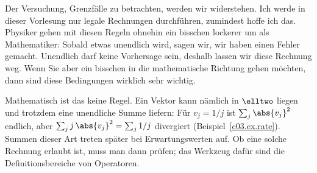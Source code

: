 \begin{fundament}
  Der Versuchung, Grenzfälle zu betrachten, werden wir widerstehen. Ich werde in dieser
  Vorlesung nur legale Rechnungen durchführen, zumindest hoffe ich das. Physiker gehen mit
  diesen Regeln ohnehin ein bisschen lockerer um als Mathematiker: Sobald etwas unendlich
  wird, sagen wir, wir haben einen Fehler gemacht. Unendlich darf keine Vorhersage sein,
  deshalb lassen wir diese Rechnung weg. Wenn Sie aber ein bisschen in die mathematische
  Richtung gehen möchten, dann sind diese Bedingungen wirklich sehr wichtig.

  Mathematisch ist das keine Regel. Ein Vektor kann nämlich in
  $\elltwo$ liegen und trotzdem eine unendliche Summe liefern: Für $v_j = 1/j$ ist
  $\sum_j \abs{v_j}^2$ endlich, aber $\sum_j j\, \abs{v_j}^2 = \sum_j 1/j$ divergiert
  (Beispiel~\ref{c03.ex.rate}). Summen dieser Art treten später bei Erwartungswerten auf.
  Ob eine solche Rechnung erlaubt ist, muss man dann prüfen; das Werkzeug dafür sind die
  Definitionsbereiche von Operatoren.
\end{fundament}

